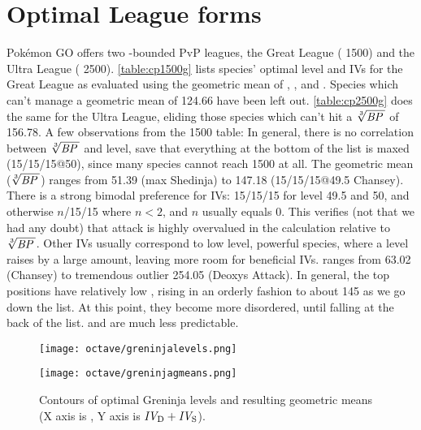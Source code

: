 \section{Optimal League forms}
Pokémon GO offers two \CP{}-bounded PvP leagues, the Great League (\CP{} 1500) and
   the Ultra League (\CP{} 2500).
\autoref{table:cp1500g} lists species' optimal level and IVs for the Great League
  as evaluated using the geometric mean of , , and \MHP{}.
Species which can't manage a geometric mean of 124.66 have been left out.
\autoref{table:cp2500g} does the same for the Ultra League, eliding those species which
  can't hit a $\sqrt[3]{\mbox{$\mathit{BP}$}\,}$ of 156.78.
A few observations from the \CP{}1500 table:
In general, there is no correlation between $\sqrt[3]{\mbox{$\mathit{BP}$}\,}$ and level,
  save that everything at the bottom of the list is maxed (15/15/15@50),
  since many species cannot reach 1500 \CP{} at all.
The geometric mean ($\sqrt[3]{\mbox{$\mathit{BP}$}\,}$) ranges from 51.39 (max Shedinja)
  to 147.18 (15/15/15@49.5 Chansey).
There is a strong bimodal preference for IVs: 15/15/15 for level 49.5
  and 50, and otherwise $n$/15/15 where $n < 2$, and $n$ usually equals 0.
This verifies (not that we had any doubt) that attack is highly overvalued in the \CP{} calculation relative to $\sqrt[3]{\mbox{$\mathit{BP}$}\,}$.
Other IVs usually correspond to low level, powerful species, where a level
  raises \CP{} by a large amount, leaving more room for beneficial IVs.
 ranges from 63.02 (Chansey) to tremendous outlier 254.05 (Deoxys Attack).
In general, the top positions have relatively low , rising in an
  orderly fashion to about 145 as we go down the list.
At this point, they become more disordered, until falling at the back
  of the list.
\MHP{} and  are much less predictable.
\begin{figure}
\begin{minipage}{0.5\textwidth}\begin{center}
\texttt{[image: octave/greninjalevels.png]}
\end{center}\end{minipage}%
\begin{minipage}{0.5\textwidth}\begin{center}
\texttt{[image: octave/greninjagmeans.png]}
\end{center}\end{minipage}%
\caption[Contours of optimal Greninja levels]{Contours of optimal Greninja levels and resulting geometric means
  (X axis is , Y axis is $\mbox{$\mathit{IV_\mathrm{D}}$} + \mbox{$\mathit{IV_\mathrm{S}}$}$).\label{fig:contours}}
\end{figure}
